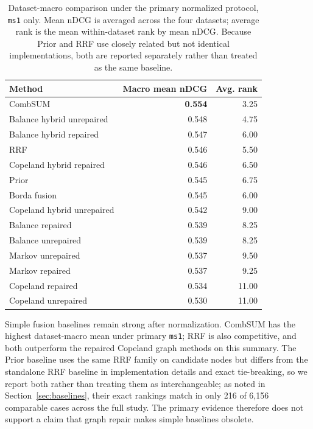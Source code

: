 \documentclass[manuscript,anonymous,review]{acmart}
\begin{document}
\begin{table}[t]
  \caption{Dataset-macro comparison under the primary normalized protocol,
    \texttt{ms1} only. Mean nDCG is averaged across the four datasets; average
    rank is the mean within-dataset rank by mean nDCG. Because Prior and RRF
    use closely related but not identical implementations, both are reported
    separately rather than treated as the same baseline.}
  \label{tab:pooled-baseline}
  \begin{tabular}{lrr}
    \toprule
    Method & Macro mean nDCG & Avg. rank \\
    \midrule
    CombSUM                  & \textbf{0.554} & 3.25 \\
    Balance hybrid unrepaired& 0.548 & 4.75 \\
    Balance hybrid repaired  & 0.547 & 6.00 \\
    RRF                      & 0.546 & 5.50 \\
    Copeland hybrid repaired & 0.546 & 6.50 \\
    Prior                    & 0.545 & 6.75 \\
    Borda fusion             & 0.545 & 6.00 \\
    Copeland hybrid unrepaired& 0.542 & 9.00 \\
    Balance repaired         & 0.539 & 8.25 \\
    Balance unrepaired       & 0.539 & 8.25 \\
    Markov unrepaired        & 0.537 & 9.50 \\
    Markov repaired          & 0.537 & 9.25 \\
    Copeland repaired        & 0.534 & 11.00 \\
    Copeland unrepaired      & 0.530 & 11.00 \\
    \bottomrule
  \end{tabular}
\end{table}

Simple fusion baselines remain strong after normalization. CombSUM has the
highest dataset-macro mean under primary \texttt{ms1}; RRF is also competitive,
and both outperform the repaired Copeland graph methods on this summary. The
Prior baseline uses the same RRF family on candidate nodes but differs from the
standalone RRF baseline in implementation details and exact tie-breaking, so we
report both rather than treating them as interchangeable; as noted in
Section~\ref{sec:baselines}, their exact rankings match in only 216 of 6,156
comparable cases across the full study. The primary evidence therefore does
not support a claim that graph repair makes simple baselines obsolete.
\end{document}
